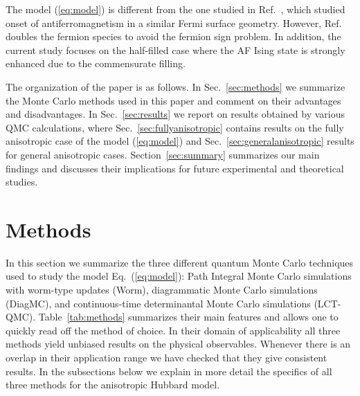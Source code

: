 \documentclass[twocolumn,superscriptaddress,pra,showpacs,longbibliography]{revtex4-1}
\newcommand{\Eq}[1]{Eq.~(\ref{#1})}
\newcommand{\<}{\langle}
\renewcommand{\>}{\rangle}
\begin{document}
The model (\ref{eq:model}) is different from the one studied in Ref.~\cite{Berg:2012ie}, which studied onset of antiferromagnetism in a similar Fermi surface geometry. However, Ref.~\cite{Berg:2012ie} doubles the fermion species to avoid the fermion sign problem. In addition, the current study focuses on the half-filled case where the AF Ising state is strongly enhanced due to the commensurate filling. 

The organization of the paper is as follows.  In Sec.~\ref{sec:methods} we summarize the Monte Carlo methods used in this paper and comment on their advantages and disadvantages. In Sec.~\ref{sec:results} we report on results obtained by various QMC calculations, where Sec.~\ref{sec:fullyanisotropic} contains results on the fully anisotropic case of the model (\ref{eq:model}) and Sec.~\ref{sec:generalanisotropic}  results for general anisotropic cases. Section~\ref{sec:summary} summarizes our main findings and discusses their implications for future experimental and theoretical studies.


\section{Methods \label{sec:methods}}
In this section we summarize the three different quantum Monte Carlo techniques used to study the model \Eq{eq:model}: Path Integral Monte Carlo simulations with worm-type updates (Worm), diagrammatic Monte Carlo simulations (DiagMC), and continuous-time determinantal Monte Carlo simulations (LCT-QMC). 
Table~\ref{tab:methods} summarizes their main features and allows one to quickly read off the method of choice. In their domain of applicability all three methods yield unbiased results on the physical observables. Whenever there is an overlap in their application range we have checked that they give consistent results. In the subsections below we explain in more detail the specifics of all three methods for the anisotropic Hubbard model.
\end{document}
